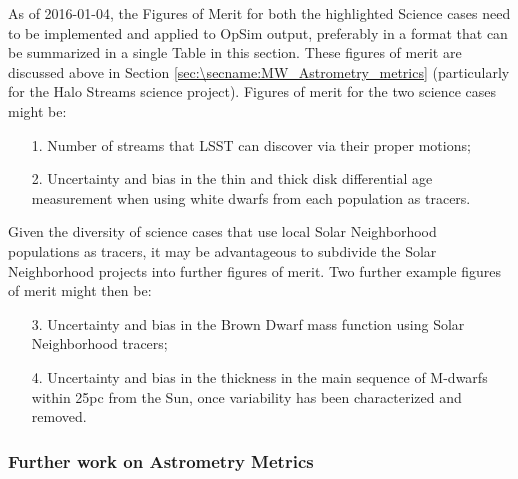 As of 2016-01-04, the Figures of Merit for both the highlighted
Science cases need to be implemented and applied to OpSim output,
preferably in a format that can be summarized in a single Table in
this section. These figures of merit are discussed above in Section
\ref{sec:\secname:MW_Astrometry_metrics} (particularly for the Halo
Streams science project). Figures of merit for the two science cases
might be:
\begin{itemize}
  \item[1.] Number of streams that LSST can discover via their proper motions;
\item[2.] Uncertainty and bias in the thin and thick disk differential age measurement when using white dwarfs from each population as tracers.
\end{itemize}

Given the diversity of science cases that use local Solar Neighborhood
populations as tracers, it may be advantageous to subdivide the Solar
Neighborhood projects into further figures of merit. Two further example
figures of merit might then be:
\begin{itemize}
  \item[3.] Uncertainty and bias in the Brown Dwarf mass function using Solar Neighborhood tracers;
   \item[4.] Uncertainty and bias in the thickness in the main sequence of M-dwarfs within 25pc from the Sun, once variability has been characterized and removed.
\end{itemize}

\subsubsection{Further work on Astrometry Metrics}


